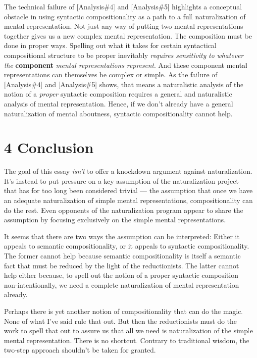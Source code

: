 \documentclass[a4paper,12pt]{article}
\begin{document}
The technical failure of [Analysis\#4] and [Analysis\#5] highlights a conceptual obstacle in using syntactic compositionality as a path to a full naturalization of mental representation. Not just any way of putting two mental representations together gives us a new complex mental representation. The composition must be done in proper ways. Spelling out what it takes for certain syntactical compositional structure to be proper inevitably \emph{requires sensitivity to whatever the} \textbf{component} \emph{mental representations represent}. And these component mental representations can themselves be complex or simple. As the failure of [Analysis\#4] and [Analysis\#5] shows, that means a naturalistic analysis of the notion of a \emph{proper} syntactic composition requires a general and naturalistic analysis of mental representation. Hence, if we don't already have a general naturalization of mental aboutness, syntactic compositionality cannot help.

\section*{4 Conclusion}
The goal of this essay \emph{isn't} to offer a knockdown argument against naturalization. It's instead to put pressure on a key assumption of the naturalization project that has for too long been considered trivial --- the assumption that once we have an adequate naturalization of simple mental representations, compositionality can do the rest. Even opponents of the naturalization program appear to share the assumption by focusing exclusively on the simple mental representations.

It seems that there are two ways the assumption can be interpreted: Either it appeals to semantic compositionality, or it appeals to syntactic compositionality. The former cannot help because semantic compositionality is itself a semantic fact that must be reduced by the light of the reductionists. The latter cannot help either because, to spell out the notion of a proper syntactic composition non-intentionally, we need a complete naturalization of mental representation already.

Perhaps there is yet another notion of compositionality that can do the magic. None of what I've said rule that out. But then the reductionists must do the work to spell that out to assure us that all we need is naturalization of the simple mental representation. There is no shortcut. Contrary to traditional wisdom, the two-step approach shouldn't be taken for granted.

\nocite{*}



\end{document}
